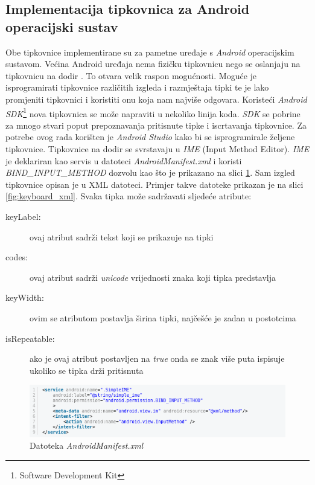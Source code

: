 \documentclass[times, utf8, zavrsni]{fer}
\begin{document}
\subsection{Implementacija tipkovnica za Android operacijski sustav}
Obe tipkovnice implementirane su za pametne uređaje s \emph{Android} operacijskim sustavom. Većina Android uređaja nema fizičku tipkovnicu nego se oslanjaju na tipkovnicu na dodir . To otvara velik raspon mogućnosti. Moguće je isprogramirati tipkovnice različitih izgleda i razmještaja tipki te je lako promjeniti tipkovnici i koristiti onu koja nam najviše odgovara. Koristeći \emph{Android SDK}\footnote{Software Development Kit} nova tipkovnica se može napraviti u nekoliko linija koda. \emph{SDK} se pobrine za mnogo stvari poput prepoznavanja pritisnute tipke i iscrtavanja tipkovnice. Za potrebe ovog rada korišten je \emph{Android Studio} kako bi se isprogramirale željene tipkovnice. Tipkovnice na dodir se svrstavaju u \emph{IME} (Input Method Editor). \emph{IME} je deklariran kao servis  u datoteci \emph{AndroidManifest.xml} i koristi \emph{BIND\_INPUT\_METHOD} dozvolu kao što je prikazano na slici \ref{fig:manifest}. Sam izgled tipkovnice opisan je u XML datoteci. Primjer takve datoteke prikazan je na slici \ref{fig:keyboard_xml}. Svaka tipka može sadržavati sljedeće atribute:
\begin{description}
\item[keyLabel:] ovaj atribut sadrži tekst koji se prikazuje na tipki
\item[codes:] ovaj atribut sadrži \emph{unicode} vrijednosti znaka koji tipka predstavlja
\item[keyWidth:] ovim se atributom postavlja širina tipki, najčešće je zadan u postotcima
\item[isRepeatable:] ako je ovaj atribut postavljen na \emph{true} onda se znak više puta ispisuje ukoliko se tipka drži pritisnuta
\end{description}

\begin{figure}[htb]
\centering
\includegraphics[width=12cm]{img/manifest.png}
\caption{Datoteka \emph{AndroidManifest.xml}}
\label{fig:manifest}
\end{figure}
\end{document}
